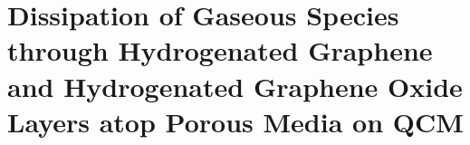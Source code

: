 \chapter{Dissipation of Gaseous Species through Hydrogenated Graphene and Hydrogenated Graphene Oxide Layers atop Porous Media on QCM}
\label{chap-eight}





